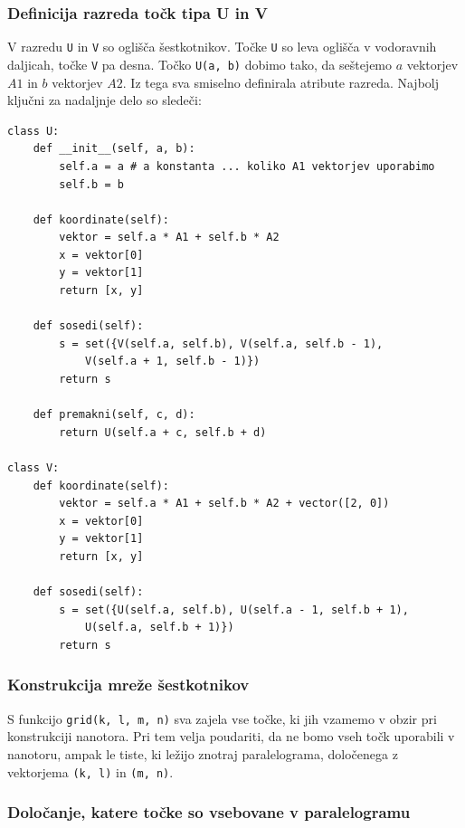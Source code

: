 \documentclass[a4paper, 10 pt, titlepage]{article}
\begin{document}
\subsubsection{Definicija razreda točk tipa U in V}

V razredu \texttt{U} in \texttt{V} so oglišča šestkotnikov. Točke \texttt{U} so leva oglišča v vodoravnih daljicah, točke \texttt{V} pa desna. Točko \texttt{U(a, b)} dobimo tako, da seštejemo $a$ vektorjev $A1$ in $b$ vektorjev $A2$. Iz tega sva smiselno definirala atribute razreda. Najbolj ključni za nadaljnje delo so sledeči:

\begin{verbatim}
class U:
    def __init__(self, a, b):
        self.a = a # a konstanta ... koliko A1 vektorjev uporabimo
        self.b = b

    def koordinate(self):
        vektor = self.a * A1 + self.b * A2
        x = vektor[0]
        y = vektor[1]
        return [x, y]

    def sosedi(self):
        s = set({V(self.a, self.b), V(self.a, self.b - 1), 
        	V(self.a + 1, self.b - 1)})
        return s
    
    def premakni(self, c, d):
        return U(self.a + c, self.b + d)

class V:       
    def koordinate(self):
        vektor = self.a * A1 + self.b * A2 + vector([2, 0])
        x = vektor[0]
        y = vektor[1]
        return [x, y]
    
    def sosedi(self):
        s = set({U(self.a, self.b), U(self.a - 1, self.b + 1), 
        	U(self.a, self.b + 1)})
        return s
\end{verbatim}

\subsubsection{Konstrukcija mreže šestkotnikov}

S funkcijo \texttt{grid(k, l, m, n)} sva zajela vse točke, ki jih vzamemo v obzir pri konstrukciji nanotora. Pri tem velja poudariti, da ne bomo vseh točk uporabili v nanotoru, ampak le tiste, ki ležijo znotraj paralelograma, določenega z vektorjema \texttt{(k, l)} in \texttt{(m, n)}. 


\subsubsection{Določanje, katere točke so vsebovane v paralelogramu}
\end{document}
